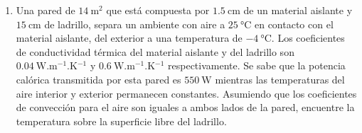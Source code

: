 \documentclass[a4paper,11pt,dvipsnames]{article}
\begin{document}
\begin{enumerate}[leftmargin=*]
  \item Una pared de $\SI{14}{\square\meter}$ que está compuesta por $\SI{1.5}{\centi\meter}$ de un material aislante y $\SI{15}{\centi\meter}$ de ladrillo, separa un ambiente con aire a $\SI{25}{\celsius}$ en contacto con el material aislante, del exterior a una temperatura de $\SI{-4}{\celsius}$. Los coeficientes de conductividad térmica del material aislante y del ladrillo son $\SI{0.04}{\watt.\meter^{-1}.\kelvin^{-1}}$ y $\SI{0.6}{\watt.\meter^{-1}.\kelvin^{-1}}$ respectivamente. Se sabe que la potencia calórica transmitida por esta pared es $\SI{550}{\watt}$ mientras las temperaturas del aire interior y exterior permanecen constantes. Asumiendo que los coeficientes de convección para el aire son iguales a ambos lados de la pared, encuentre la temperatura sobre la superficie libre del ladrillo.\\


\end{enumerate}
\end{document}
